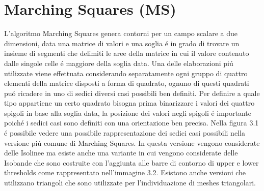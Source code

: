 \documentclass[12pt,a4paper]{report}
\begin{document}
\section{Marching Squares (MS)} %
L'algoritmo Marching Squares genera contorni per un campo scalare a due dimensioni, data una matrice di valori e una soglia é in grado di trovare un insieme di segmenti che delimiti le aree della matrice in cui il valore contenuto dalle singole celle é maggiore della soglia data. \newline
Una delle elaborazioni piú utilizzate viene effettuata considerando separatamente ogni gruppo di quattro elementi della matrice disposti a forma di quadrato, ognuno di questi quadrati puó ricadere in uno di sedici diversi casi possibili ben definiti. Per definire a quale tipo appartiene un certo quadrato bisogna prima binarizzare i valori dei quattro spigoli in base alla soglia data, la posizione dei valori negli spigoli é importante poiché i sedici casi sono definiti con una orientazione ben precisa. Nella figura 3.1 é possibile vedere una possibile rappresentazione dei sedici casi possibili nella versione piú comune di Marching Squares.
In questa versione vengono considerate delle Isolinee ma esiste anche una variante in cui vengono considerate delle Isobande che sono costruite con l'aggiunta alle barre di contorno di upper e lower thresholds come rappresentato nell'immagine 3.2. \newline Esistono anche versioni che utilizzano triangoli che sono utilizzate per l'individuazione di meshes triangolari.
\end{document}
